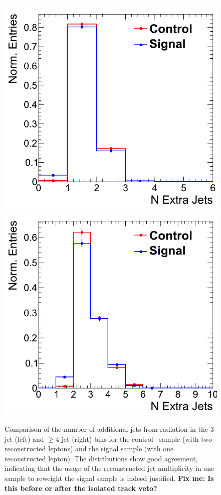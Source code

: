 \begin{figure}[hbt]
  \begin{center}
	\includegraphics[width=0.5\linewidth]{plots/ttdl_njets_presel_3j_comp.png}%
	\includegraphics[width=0.5\linewidth]{plots/ttdl_njets_presel_4j_comp.png}
	\caption{
	  \label{fig:dileptonnjets_signalcontrol_comp}%
          Comparison of the number of additional jets from radiation
          in the 3-jet (left) and $\ge4$-jet (right) bins for the control \ttll\
          sample (with two reconstructed leptons) and the signal
          sample (with one reconstructed lepton). The distributions
          show good agreement, indicating that the usage of the
          reconstructed jet multiplicity in one sample to reweight the
        signal sample is indeed justified. {\bf Fix me: Is this before or after the isolated track veto?}}  
      \end{center}
\end{figure}

